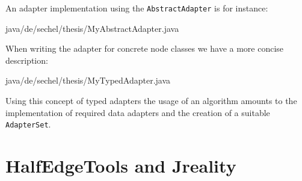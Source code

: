 An adapter implementation using the {\tt AbstractAdapter} is for instance:

 {java/de/sechel/thesis/MyAbstractAdapter.java}

When writing the adapter for concrete node classes we have a more concise description:

 {java/de/sechel/thesis/MyTypedAdapter.java}

Using this concept of typed adapters the usage of an algorithm amounts to the implementation of
required data adapters and the creation of a suitable {\tt AdapterSet}.




\section{{\sc HalfEdgeTools} and {\sc Jreality}}

